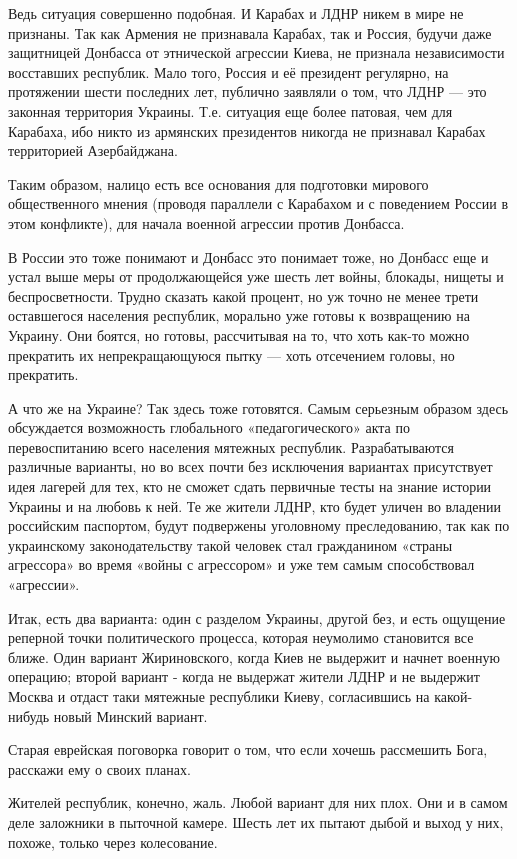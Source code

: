 Ведь ситуация совершенно подобная. И Карабах и ЛДНР никем в мире не признаны.
Так как Армения не признавала Карабах, так и Россия, будучи даже защитницей
Донбасса от этнической агрессии Киева, не признала независимости восставших
республик. Мало того, Россия и её президент регулярно, на протяжении шести
последних лет, публично заявляли о том, что ЛДНР --- это законная территория
Украины. Т.е. ситуация еще более патовая, чем для Карабаха, ибо никто из
армянских президентов никогда не признавал Карабах территорией Азербайджана. 

Таким образом, налицо есть все основания для подготовки мирового общественного
мнения (проводя параллели с Карабахом и с поведением России в этом конфликте),
для начала военной агрессии против Донбасса.

В России это тоже понимают и Донбасс это понимает тоже, но Донбасс еще и устал
выше меры от продолжающейся уже шесть лет войны, блокады, нищеты и
беспросветности. Трудно сказать какой процент, но уж точно не менее трети
оставшегося населения республик, морально уже готовы к возвращению на Украину.
Они боятся, но готовы, рассчитывая на то, что хоть как-то можно прекратить их
непрекращающуюся пытку --- хоть отсечением головы, но прекратить. 

А что же на Украине? Так здесь тоже готовятся. Самым серьезным образом здесь
обсуждается возможность глобального «педагогического» акта по перевоспитанию
всего населения мятежных республик. Разрабатываются различные варианты, но во
всех почти без исключения вариантах присутствует идея лагерей для тех, кто не
сможет сдать первичные тесты на знание истории Украины и на любовь к ней. Те же
жители ЛДНР, кто будет уличен во владении российским паспортом, будут
подвержены уголовному преследованию, так как по украинскому законодательству
такой человек стал гражданином «страны агрессора» во время «войны с агрессором»
и уже тем самым способствовал «агрессии». 

Итак, есть два варианта: один с разделом Украины, другой без, и есть ощущение
реперной точки политического процесса, которая неумолимо становится все ближе.
Один вариант Жириновского, когда Киев не выдержит и начнет военную операцию;
второй вариант - когда не выдержат жители ЛДНР и не выдержит Москва и отдаст
таки мятежные республики Киеву, согласившись на какой-нибудь новый Минский
вариант.

Старая еврейская поговорка говорит о том, что если хочешь рассмешить Бога,
расскажи ему о своих планах. 

Жителей республик, конечно, жаль. Любой вариант для них плох. Они и в самом
деле заложники в пыточной камере. Шесть лет их пытают дыбой и выход у них,
похоже, только через колесование.
